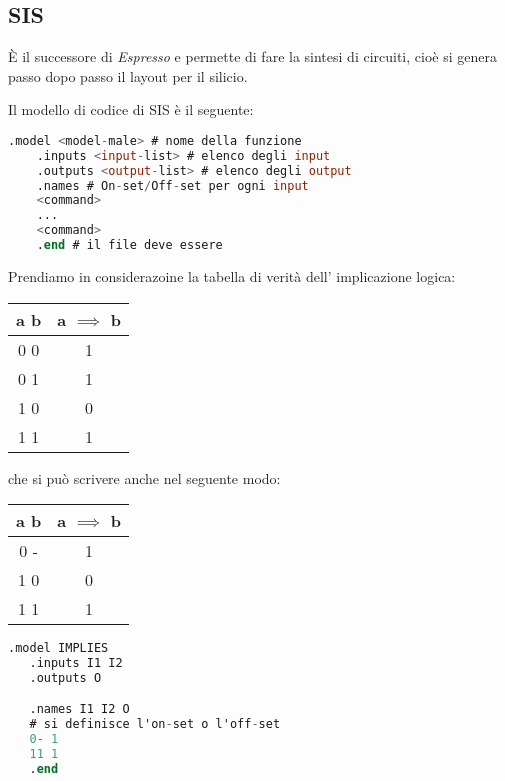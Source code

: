 \documentclass[a4paper]{article}
\theoremstyle{break}
\theoremstyle{break}
\theoremstyle{break}
\theoremstyle{break}
\begin{document}
\subsection{SIS}
È il successore di \emph{Espresso} e permette di fare la sintesi di circuiti, cioè
si genera passo dopo passo il layout per il silicio.

Il modello di codice di SIS è il seguente:
\begin{lstlisting}[language=Verilog]
    .model <model-male> # nome della funzione
    .inputs <input-list> # elenco degli input
    .outputs <output-list> # elenco degli output
    .names # On-set/Off-set per ogni input
    <command> 
    ...
    <command>
    .end # il file deve essere 
\end{lstlisting}

\begin{example}
   Prendiamo in considerazoine la tabella di verità dell'
   implicazione logica:
   \begin{table}[H]
    \begin{center}
        \begin{tabular}{c|c}
            a b & a \(\implies\) b\\
            \hline
            0 0 & 1\\
            0 1 & 1\\
            1 0 & 0\\
            1 1 & 1\\
        \end{tabular}
    \end{center}
   \end{table}
   che si può scrivere anche nel seguente modo:
      \begin{table}[H]
    \begin{center}
        \begin{tabular}{c|c}
            a b & a \(\implies\) b\\
            \hline
            0 - & 1\\
            1 0 & 0\\
            1 1 & 1\\
        \end{tabular}
    \end{center}
   \end{table}

\begin{lstlisting}[language=Verilog]
   .model IMPLIES
   .inputs I1 I2
   .outputs O

   .names I1 I2 O
   # si definisce l'on-set o l'off-set  
   0- 1
   11 1
   .end
\end{lstlisting}
\end{example}
\end{document}
